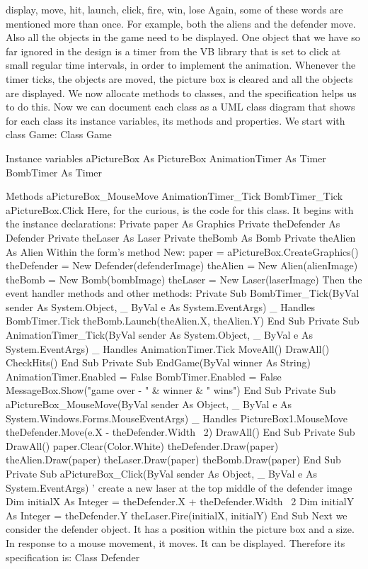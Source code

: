 display, move, hit, launch, click, fire, win, lose
Again, some of these words are mentioned more than once. For example, both the aliens and the defender move. Also all the objects in the game need to be displayed.
One object that we have so far ignored in the design is a timer from the VB library that is set to click at small regular time intervals, in order to implement the animation. Whenever the timer ticks, the objects are moved, the picture box is cleared and all the objects are displayed.
We now allocate methods to classes, and the speciﬁcation helps us to do this.
Now we can document each class as a UML class diagram that shows for each class its instance variables, its methods and properties. We start with class Game:
Class Game

Instance variables
aPictureBox As PictureBox
AnimationTimer As Timer
BombTimer As Timer

Methods
aPictureBox_MouseMove
AnimationTimer_Tick
BombTimer_Tick
aPictureBox.Click
Here, for the curious, is the code for this class. It begins with the instance declarations:
Private paper As Graphics
Private theDefender As Defender
Private theLaser As Laser
Private theBomb As Bomb
Private theAlien As Alien
Within the form’s method New:
paper = aPictureBox.CreateGraphics()
theDefender = New Defender(defenderImage)
theAlien = New Alien(alienImage)
theBomb = New Bomb(bombImage)
theLaser = New Laser(laserImage)
Then the event handler methods and other methods:
Private Sub BombTimer_Tick(ByVal sender As System.Object, _
		ByVal e As System.EventArgs) _
		Handles BombTimer.Tick
	theBomb.Launch(theAlien.X, theAlien.Y)
End Sub
Private Sub AnimationTimer_Tick(ByVal sender As System.Object, _
			ByVal e As System.EventArgs) _
			Handles AnimationTimer.Tick
	MoveAll()
	DrawAll()
	CheckHits()
End Sub
Private Sub EndGame(ByVal winner As String)
	AnimationTimer.Enabled = False
	BombTimer.Enabled = False
	MessageBox.Show("game over - " & winner & " wins")
End Sub
Private Sub aPictureBox_MouseMove(ByVal sender As Object, _
			ByVal e As System.Windows.Forms.MouseEventArgs) _
			Handles PictureBox1.MouseMove
	theDefender.Move(e.X - theDefender.Width \ 2)
	DrawAll()
End Sub
Private Sub DrawAll()
	paper.Clear(Color.White)
	theDefender.Draw(paper)
	theAlien.Draw(paper)
	theLaser.Draw(paper)
	theBomb.Draw(paper)
End Sub
Private Sub aPictureBox_Click(ByVal sender As Object, _
			ByVal e As System.EventArgs)
	' create a new laser at the top middle of the defender image
	Dim initialX As Integer = theDefender.X + theDefender.Width \ 2
	Dim initialY As Integer = theDefender.Y
	theLaser.Fire(initialX, initialY)
End Sub
Next we consider the defender object. It has a position within the picture box and 
a size. In response to a mouse movement, it moves. It can be displayed. Therefore its speciﬁcation is:
Class Defender

